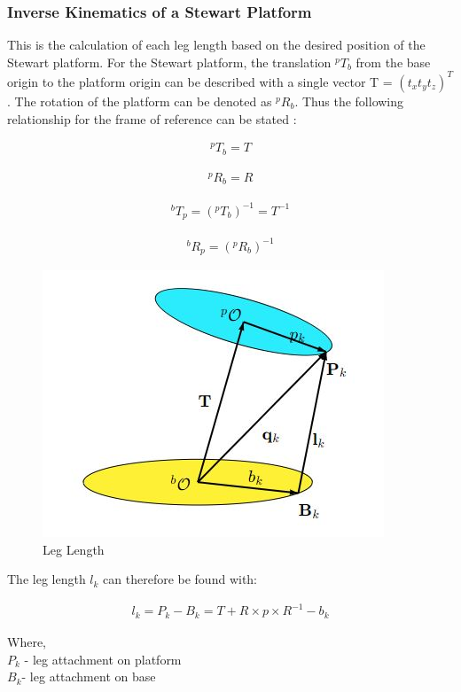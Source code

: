 \subsubsection{Inverse Kinematics of a Stewart Platform}
This is the calculation of each leg length based on the desired position of the Stewart platform.
For the Stewart platform, the translation $^{p}T_{b}$ from the base origin to the platform origin can be described with a single vector T = $(t_{x} t_{y} t_{z})^{T} $. The rotation of the platform can be denoted as $^{p}R_{b}$. Thus the following relationship for the frame of reference can be stated \cite{Eisele_2019}:
\begin{ceqn}
	\begin{align}
		^{p}T_{b} = T
	\end{align}
\end{ceqn}
\begin{ceqn}
	\begin{align}
		^{p}R_{b} = R
	\end{align}
\end{ceqn}
\begin{ceqn}
	\begin{align}
		^{b}T_{p} =(^{p}T_{b})^{-1} =T^{-1}
	\end{align}
\end{ceqn}
\begin{ceqn}
	\begin{align}
		^{b}R_{p} = (^{p}R_{b})^{-1}
	\end{align}
\end{ceqn}
\begin{center}
	\begin{figure}[!h]
		\centering
		\includegraphics[width=0.4\linewidth]{Figures/servo2}
		\caption[Leg length]{Leg Length \cite{Eisele_2019}}
	\end{figure}
\end{center}
The leg length $l_{k}$ can therefore be found with:
\begin{ceqn}
	\begin{align}
		l_{k} = P_{k} - B_{k} = T + R \times p \times R^{-1} - b_{k}
	\end{align}
\end{ceqn}
Where,\\
$P_{k}$ - leg attachment on platform \\
$B_{k}$- leg attachment on base
